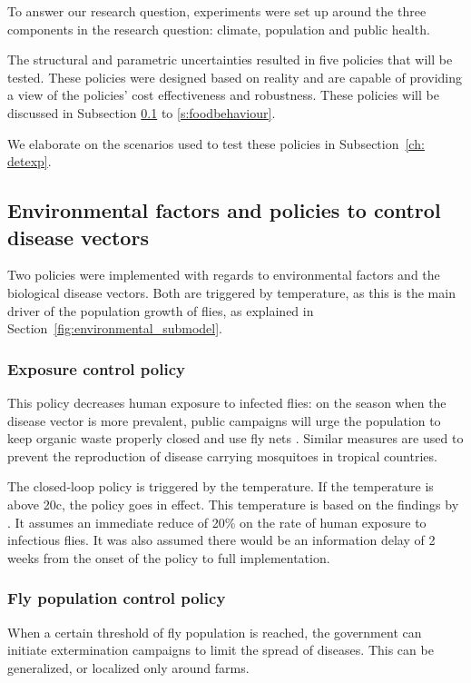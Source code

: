 
To answer our research question, experiments were set up around the three components in the research question: climate, population and public health. 

The structural and parametric uncertainties resulted in five policies that will be tested. These policies were designed based on reality and are capable of providing a view of the policies' cost effectiveness and robustness. These policies will be discussed in Subsection \ref{s:environmentalfactors} to \ref{s:foodbehaviour}. 

We elaborate on the scenarios used to test these policies in Subsection~\ref{ch: detexp}.

\subsection{Environmental factors and policies to control disease vectors}
\label{s:environmentalfactors}
Two policies were implemented with regards to environmental factors and the biological disease vectors. Both are triggered by temperature, as this is the main driver of the population growth of flies, as explained in Section~\ref{fig:environmental_submodel}.

\subsubsection{Exposure control policy}
This policy decreases human exposure to infected flies: on the season when the disease vector is more prevalent, public campaigns will urge the population to keep organic waste properly closed and use fly nets \parencite{hald_use_2007}. Similar measures are used to prevent the reproduction of disease carrying mosquitoes in tropical countries. %

The closed-loop policy is triggered by the temperature. If the temperature is above 20\degree c, the policy goes in effect. This temperature is based on the findings by \cite{schou_temperature_2013}. It assumes an immediate reduce of 20\% on the rate of human exposure to infectious flies. It was also assumed there would be an information delay of 2 weeks from the onset of the policy to full implementation.

\subsubsection{Fly population control policy}
When a certain threshold of fly population is reached, the government can initiate extermination campaigns to limit the spread of diseases. This can be generalized, or localized only around farms.

